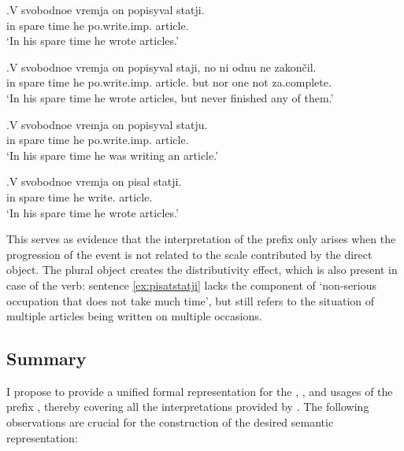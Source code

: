 \exg.\label{ex:popisyvat}V svobodnoe vremja on popisyval statji.\\
in spare time he po.write.imp. article.\\
\trans `In his spare time he wrote articles.'

\exg.\label{ex:popisyvat:none}V svobodnoe vremja on popisyval staji, no ni odnu ne zakon\v{c}il.\\
in spare time he po.write.imp. article. but nor one not za.complete.\\
\trans `In his spare time he wrote articles, but never finished any of them.'

\exg.\label{ex:popisyvat:single}V svobodnoe vremja on popisyval statju.\\
in spare time he po.write.imp. article.\\
\trans `In his spare time he was writing an article.'

\exg.\label{ex:pisatstatji}V svobodnoe vremja on pisal statji.\\
in spare time he write. article.\\
\trans `In his spare time he wrote articles.'

This serves as evidence that the  interpretation of the prefix  only arises when the progression of the event is not related to the scale contributed by the direct object. The plural object creates the distributivity effect, which is also present in case of the  verb: sentence \ref{ex:pisatstatji} lacks the component of `non-serious occupation that does not take much time', but still refers to the situation of multiple articles being written on multiple occasions. 

\subsection{Summary}
I propose to provide a unified formal representation for the , , and  usages of the prefix , thereby covering all the interpretations provided by \citet{Shvedova:82}. The following observations are crucial for the construction of the desired semantic representation:

